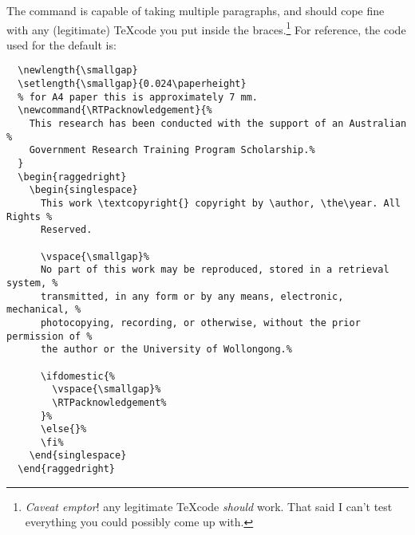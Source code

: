 \documentclass[12pt,oneside]{article}
\begin{document}
\begin{description}
    The command is capable of taking multiple paragraphs, and should cope fine with any (legitimate) \TeX code you put inside the braces.\footnote{\emph{Caveat emptor}! any legitimate \TeX code \emph{should} work. That said I can't test everything you could possibly come up with.} For reference, the code used for the default is:
\begin{lstlisting}
  \newlength{\smallgap}
  \setlength{\smallgap}{0.024\paperheight}
  % for A4 paper this is approximately 7 mm.
  \newcommand{\RTPacknowledgement}{%
    This research has been conducted with the support of an Australian %
    Government Research Training Program Scholarship.%
  }
  \begin{raggedright}
    \begin{singlespace}
      This work \textcopyright{} copyright by \author, \the\year. All Rights %
      Reserved.
  
      \vspace{\smallgap}%
      No part of this work may be reproduced, stored in a retrieval system, %
      transmitted, in any form or by any means, electronic, mechanical, %
      photocopying, recording, or otherwise, without the prior permission of %
      the author or the University of Wollongong.%
  
      \ifdomestic{%
        \vspace{\smallgap}%
        \RTPacknowledgement%
      }%
      \else{}%
      \fi%
    \end{singlespace}
  \end{raggedright}
\end{lstlisting}

\end{description}
\end{document}
